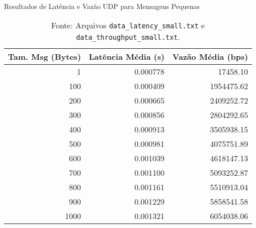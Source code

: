\begin{table}[H] %
    \centering
    \caption{Resultados de Latência e Vazão UDP para Mensagens Pequenas}
    \label{tab:resultados_udp_pequenas}
    \begin{tabular}{rrr}
        \toprule
        Tam. Msg (Bytes) & Latência Média (s) & Vazão Média (bps) \\
        \midrule
        1 & 0.000778 & 17458.10 \\
        100 & 0.000409 & 1954475.62 \\
        200 & 0.000665 & 2409252.72 \\
        300 & 0.000856 & 2804292.65 \\
        400 & 0.000913 & 3505938.15 \\
        500 & 0.000981 & 4075751.89 \\
        600 & 0.001039 & 4618147.13 \\
        700 & 0.001100 & 5093252.87 \\
        800 & 0.001161 & 5510913.04 \\
        900 & 0.001229 & 5858541.58 \\
        1000 & 0.001321 & 6054038.06 \\
        \bottomrule
    \end{tabular}
    \caption*{Fonte: Arquivos \texttt{data\_latency\_small.txt} e \texttt{data\_throughput\_small.txt}.}
\end{table}

